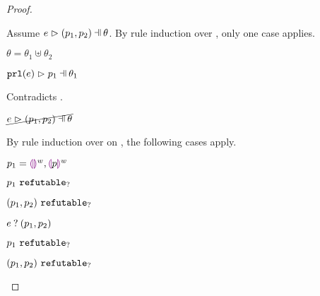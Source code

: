 \begin{proof}
\begin{byCases}
\begin{byCases}
\begin{byCases}
\begin{pfsteps*}
            \end{pfsteps*}
            Assume $\hpatmatch{e}{\hpair{p_1}{p_2}}{\theta}$. By rule induction over , only one case applies.
            \begin{byCases}
            \item[\text{(\ref{rule:MNotIntroPair})}]
                \begin{pfsteps*}
                \item $\theta=\theta_1\uplus\theta_2$ 
                \item $\hpatmatch{\hprl{e}}{p_1}{\theta_1}$  
                \end{pfsteps*}
                Contradicts .
            \end{byCases}
            \begin{pfsteps*}
            \item $\cancel{\hpatmatch{e}{\hpair{p_1}{p_2}}{\theta}}$ 
            \end{pfsteps*}
            By rule induction over  on , the following cases apply.
            \begin{byCases}
            \item[\text{(\ref{rule:MMEHole}),(\ref{rule:MMHole})}]
                \begin{pfsteps*}
                \item $p_1=\textcolor{violet}{\llparenthesis}\textcolor{violet}{\rrparenthesis}^{w},\textcolor{violet}{\llparenthesis} p\textcolor{violet}{\rrparenthesis}^{w}$ 
                \item $p_1 ~\mathtt{refutable}_?$  
                \item $(p_1 , p_2) ~\mathtt{refutable}_?$  
                \item $e \mathbin{?} (p_1 , p_2)$ 
                \end{pfsteps*}
            \item[\text{(\ref{rule:MMNotIntro})}]
                \begin{pfsteps*}
                \item $p_1 ~\mathtt{refutable}_?$  
                \item $(p_1 , p_2) ~\mathtt{refutable}_?$  

\end{pfsteps*}
\end{byCases}
\end{byCases}
\end{byCases}
\end{byCases}
\end{proof}
